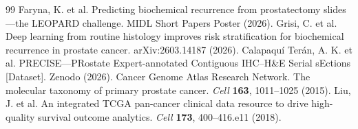 \begin{thebibliography}{99}
 Faryna, K. et al. Predicting biochemical recurrence from
prostatectomy slides---the LEOPARD challenge. MIDL Short Papers Poster (2026).
 Grisi, C. et al. Deep learning from routine histology improves risk
stratification for biochemical recurrence in prostate cancer. arXiv:2603.14187 (2026).
 Calapaqu\'i Ter\'an, A. K. et al. PRECISE---PRostate
Expert-annotated Contiguous IHC--H\&E Serial sEctions [Dataset]. Zenodo (2026).
 Cancer Genome Atlas Research Network. The molecular taxonomy of
primary prostate cancer. \textit{Cell} \textbf{163}, 1011--1025 (2015).
 Liu, J. et al. An integrated TCGA pan-cancer clinical data
resource to drive high-quality survival outcome analytics. \textit{Cell} \textbf{173},
400--416.e11 (2018).
\end{thebibliography}
